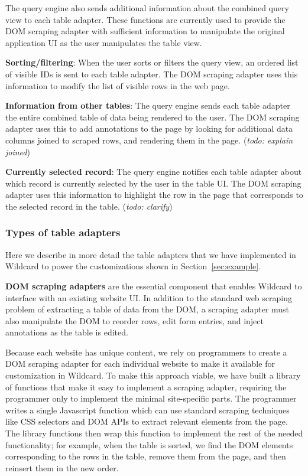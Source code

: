\documentclass[sigplan,screen,10pt,anonymous,review]{acmart}
\begin{document}
The query engine also sends additional information about the combined
query view to each table adapter. These functions are currently used to
provide the DOM scraping adapter with sufficient information to
manipulate the original application UI as the user manipulates the table
view.

\textbf{Sorting/filtering}: When the user sorts or filters the query
view, an ordered list of visible IDs is sent to each table adapter. The
DOM scraping adapter uses this information to modify the list of visible
rows in the web page.

\textbf{Information from other tables}: The query engine sends each
table adapter the entire combined table of data being rendered to the
user. The DOM scraping adapter uses this to add annotations to the page
by looking for additional data columns joined to scraped rows, and
rendering them in the page. (\emph{todo: explain joined})

\textbf{Currently selected record}: The query engine notifies each table
adapter about which record is currently selected by the user in the
table UI. The DOM scraping adapter uses this information to highlight
the row in the page that corresponds to the selected record in the
table. (\emph{todo: clarify})

\hypertarget{types-of-table-adapters}{%
\subsubsection{Types of table adapters}\label{types-of-table-adapters}}

Here we describe in more detail the table adapters that we have
implemented in Wildcard to power the customizations shown in
Section~\ref{sec:example}.

\textbf{DOM scraping adapters} are the essential component that enables
Wildcard to interface with an existing website UI. In addition to the
standard web scraping problem of extracting a table of data from the
DOM, a scraping adapter must also manipulate the DOM to reorder rows,
edit form entries, and inject annotations as the table is edited.

Because each website has unique content, we rely on programmers to
create a DOM scraping adapter for each individual website to make it
available for customization in Wildcard. To make this approach viable,
we have built a library of functions that make it easy to implement a
scraping adapter, requiring the programmer only to implement the minimal
site-specific parts. The programmer writes a single Javascript function
which can use standard scraping techniques like CSS selectors and DOM
APIs to extract relevant elements from the page. The library functions
then wrap this function to implement the rest of the needed
functionality; for example, when the table is sorted, we find the DOM
elements corresponding to the rows in the table, remove them from the
page, and then reinsert them in the new order.
\end{document}
